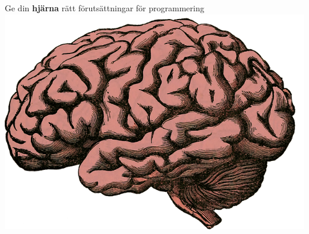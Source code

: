 
\ifkompendium\else
\begin{SlideExtra}{Ge din \textbf{hjärna} rätt förutsättningar för programmering}
  \includegraphics[height=0.9\textheight]{../img/brain.png}
\end{SlideExtra}
\fi
  
